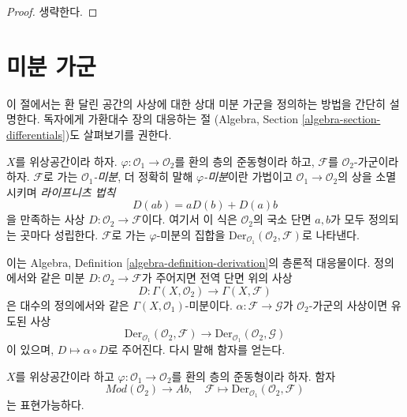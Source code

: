 \begin{proof}
생략한다.
\end{proof}








\section{미분 가군}
\label{section-differentials}

\noindent
이 절에서는 환 달린 공간의 사상에 대한 상대 미분 가군을 정의하는
방법을 간단히 설명한다. 독자에게 가환대수 장의 대응하는 절
(Algebra, Section \ref{algebra-section-differentials})도 살펴보기를 권한다.

\begin{definition}
\label{definition-derivation}
$X$를 위상공간이라 하자. $\varphi : \mathcal{O}_1 \to \mathcal{O}_2$를
환의 층의 준동형이라 하고, $\mathcal{F}$를 $\mathcal{O}_2$-가군이라 하자.
$\mathcal{F}$로 가는 {\it $\mathcal{O}_1$-미분}, 더 정확히 말해
{\it $\varphi$-미분}이란 가법이고
$\mathcal{O}_1 \to \mathcal{O}_2$의 상을 소멸시키며
{\it 라이프니츠 법칙}
$$
D(ab) = aD(b) + D(a)b
$$
을 만족하는 사상 $D : \mathcal{O}_2 \to \mathcal{F}$이다.
여기서 이 식은 $\mathcal{O}_2$의 국소 단면 $a, b$가 모두 정의되는
곳마다 성립한다. $\mathcal{F}$로 가는 $\varphi$-미분의 집합을
$\text{Der}_{\mathcal{O}_1}(\mathcal{O}_2, \mathcal{F})$로 나타낸다.
\end{definition}

\noindent
이는 Algebra, Definition \ref{algebra-definition-derivation}의
층론적 대응물이다. 정의에서와 같은 미분
$D : \mathcal{O}_2 \to \mathcal{F}$가 주어지면 전역 단면 위의 사상
$$
D : \Gamma(X, \mathcal{O}_2) \longrightarrow \Gamma(X, \mathcal{F})
$$
은 대수의 정의에서와 같은 $\Gamma(X, \mathcal{O}_1)$-미분이다.
$\alpha : \mathcal{F} \to \mathcal{G}$가 $\mathcal{O}_2$-가군의
사상이면 유도된 사상
$$
\text{Der}_{\mathcal{O}_1}(\mathcal{O}_2, \mathcal{F})
\longrightarrow
\text{Der}_{\mathcal{O}_1}(\mathcal{O}_2, \mathcal{G})
$$
이 있으며, $D \mapsto \alpha \circ D$로 주어진다.
다시 말해 함자를 얻는다.

\begin{lemma}
\label{lemma-universal-module}
$X$를 위상공간이라 하고
$\varphi : \mathcal{O}_1 \to \mathcal{O}_2$를 환의 층의 준동형이라 하자.
함자
$$
\textit{Mod}(\mathcal{O}_2) \longrightarrow \textit{Ab}, \quad
\mathcal{F} \longmapsto \text{Der}_{\mathcal{O}_1}(\mathcal{O}_2, \mathcal{F})
$$
는 표현가능하다.
\end{lemma}

